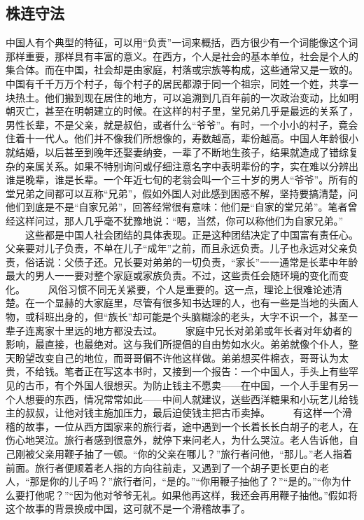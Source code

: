 \documentclass[12pt,oneside]{book}
\begin{document}
\begin{common-format}
\chapter{株连守法}
中国人有个典型的特征，可以用“负责”一词来概括，西方很少有一个词能像这个词那样重要，那样具有丰富的意义。在西方，个人是社会的基本单位，社会是个人的集合体。而在中国，社会却是由家庭，村落或宗族等构成，这些通常又是一致的。中国有千千万万个村子，每个村子的居民都源于同一个祖宗，同姓一个姓，共享一块热土。他们搬到现在居住的地方，可以追溯到几百年前的一次政治变动，比如明朝灭亡，甚至在明朝建立的时候。在这样的村子里，堂兄弟几乎是最远的关系了，男性长辈，不是父亲，就是叔伯，或者什么“爷爷”。有时，一个小小的村子，竟会住着十一代人。他们并不像我们所想像的，寿数越高，辈份越高。中国人年龄很小就结婚，以后甚至到晚年还娶妻纳妾，一辈了不断地生孩子，结果就造成了错综复杂的亲属关系。如果不特别询问或仔细注意名字中表明辈份的字，实在难以分辨出谁是晚辈，谁是长辈。一个年近七旬的老翁会叫一个三十岁的男人“爷爷”。所有的堂兄弟之间都可以互称“兄弟”，假如外国人对此感到困惑不解，坚持要搞清楚，问他们到底是不是“自家兄弟”，回答经常很有意味：他们是“自家的堂兄弟”。笔者曾经这样问过，那人几乎毫不犹豫地说：“嗯，当然，你可以称他们为自家兄弟。” 
　　这些都是中国人社会团结的具体表现。正是这种团结决定了中国富有责任心。父亲要对儿子负责，不单在儿子“成年”之前，而且永远负责。儿子也永远对父亲负责，俗话说：父债子还。兄长要对弟弟的一切负责，“家长”一一通常是长辈中年龄最大的男人一一要对整个家庭或家族负责。不过，这些责任会随环境的变化而变化。 
　　风俗习惯不同无关紧要，个人是重要的。这一点，理论上很难论述清楚。在一个显赫的大家庭里，尽管有很多知书达理的人，也有一些是当地的头面人物，或科班出身的，但“族长”却可能是个头脑糊涂的老头，大字不识一个，甚至一辈子连离家十里远的地方都没去过。 
　　家庭中兄长对弟弟或年长者对年幼者的影响，最直接，也最绝对。这与我们所提倡的自由势如水火。弟弟就像个仆人，整天盼望改变自己的地位，而哥哥偏不许他这样做。弟弟想买件棉衣，哥哥认为太贵，不给钱。笔者正在写这本书时，又接到一个报告：一个中国人，手头上有些罕见的古币，有个外国人很想买。为防止钱主不愿卖——在中国，一个人手里有另一个人想要的东西，情况常常如此——中间人就建议，送些西洋糖果和小玩艺儿给钱主的叔叔，让他对钱主施加压力，最后迫使钱主把古币卖掉。 
　　有这样一个滑稽的故事，一位从西方国家来的旅行者，途中遇到一个长着长长白胡子的老人，在伤心地哭泣。旅行者感到很意外，就停下来问老人，为什么哭泣。老人告诉他，自己刚被父亲用鞭子抽了一顿。“你的父亲在哪儿？”旅行者问他，“那儿。”老人指着前面。旅行者便顺着老人指的方向往前走，又遇到了一个胡子更长更白的老人，“那是你的儿子吗？”旅行者问，“是的。”“你用鞭子抽他了？”“是的。”“你为什么要打他呢？”“因为他对爷爷无礼。如果他再这样，我还会再用鞭子抽他。”假如将这个故事的背景换成中国，这可就不是一个滑稽故事了。 

\end{common-format}
\end{document}
